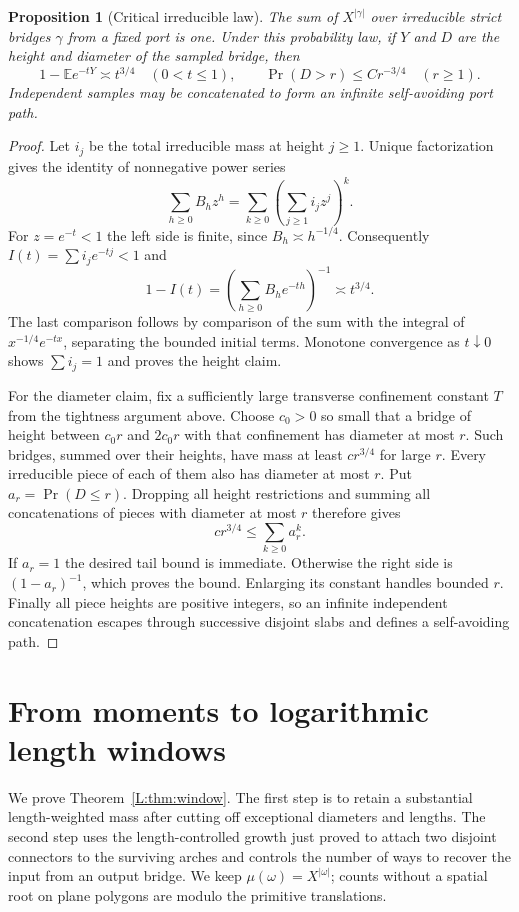 \documentclass[11pt]{article}
\numberwithin{equation}{section}
\newtheorem{proposition}[theorem]{Proposition}
\theoremstyle{definition}\newtheorem{definition}[theorem]{Definition}
\theoremstyle{remark}\newtheorem{remark}[theorem]{Remark}
\begin{document}
\begin{proposition}[Critical irreducible law]\label{L:prop:irreducible}
The sum of $X^{|\gamma|}$ over irreducible strict bridges $\gamma$ from a
fixed port is one. Under this probability law, if $Y$ and $D$ are the
height and diameter of the sampled bridge, then
\[
 1-\mathbb E e^{-tY}\asymp t^{3/4}\quad(0<t\le1),\qquad
 \Pr(D>r)\le C r^{-3/4}\quad(r\ge1).
\]
Independent samples may be concatenated to form an infinite
self-avoiding port path.
\end{proposition}
\begin{proof}
Let $i_j$ be the total irreducible mass at height $j\ge1$. Unique
factorization gives the identity of nonnegative power series
\[
 \sum_{h\ge0}B_hz^h=\sum_{k\ge0}\left(\sum_{j\ge1}i_jz^j\right)^k.
\]
For $z=e^{-t}<1$ the left side is finite, since $B_h\asymp h^{-1/4}$.
Consequently $I(t)=\sum i_j e^{-tj}<1$ and
\[
 1-I(t)=\left(\sum_{h\ge0}B_he^{-th}\right)^{-1}\asymp t^{3/4}.
\]
The last comparison follows by comparison of the sum with the integral
of $x^{-1/4}e^{-tx}$, separating the bounded initial terms. Monotone
convergence as $t\downarrow0$ shows $\sum i_j=1$ and proves the height
claim.

For the diameter claim, fix a sufficiently large transverse confinement
constant $T$ from the tightness argument above. Choose $c_0>0$ so small
that a bridge of height between $c_0r$ and $2c_0r$ with that confinement
has diameter at most $r$. Such bridges, summed over their heights, have
mass at least $c r^{3/4}$ for large $r$. Every irreducible piece of each
of them also has diameter at most $r$. Put $a_r=\Pr(D\le r)$. Dropping
all height restrictions and summing all concatenations of pieces with
diameter at most $r$ therefore gives
\[
 c r^{3/4}\le\sum_{k\ge0}a_r^k.
\]
If $a_r=1$ the desired tail bound is immediate. Otherwise the right side
is $(1-a_r)^{-1}$, which proves the bound. Enlarging its constant handles
bounded $r$. Finally all piece heights are positive integers, so an
infinite independent concatenation escapes through successive disjoint
slabs and defines a self-avoiding path.
\end{proof}


\section{From moments to logarithmic length windows}\label{L:part11}

We prove Theorem~\ref{L:thm:window}. The first step is to retain a substantial length-weighted mass after cutting off exceptional diameters and lengths. The second step uses the length-controlled growth just proved to attach two disjoint connectors to the surviving arches and controls the number of ways to recover the input from an output bridge. We keep \(\mu(\omega)=X^{|\omega|}\); counts without a spatial root on plane polygons are modulo the primitive translations.
\end{document}
